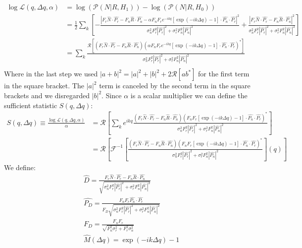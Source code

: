 \documentclass[a4paper]{article}
\newcommand{\rb}[1]{\left(#1\right)}
\newcommand{\sqb}[1]{\left[#1\right]}
\newcommand{\abs}[1]{\left|#1\right|}
\begin{document}
	\begin{equation}
	\begin{split}
	\log{\mathcal{L}\rb{q,\Delta q,\alpha}} &= \log\rb{\mathcal{P}\rb{N|R,H_1}} - \log\rb{\mathcal{P}\rb{N|R,H_0}}\\
	& = \frac{1}{2}\sum_k \sqb{- \frac{\abs{F_r \hat{N} \cdot \hat{P_r} - F_n \hat{R}\cdot \hat{P_n} - \alpha F_n F_r e^{-ikq}\sqb{\exp\rb{-ik\Delta q} - 1}\cdot \hat{P_n}\cdot \hat{P_r}}^2}{\sigma^2_n F_r^2 \abs{\hat{P_r}}^2 + \sigma^2_r F_n^2 \abs{\hat{P_n}}^2} + \frac{\abs{F_r \hat{N} \cdot \hat{P_r} - F_n \hat{R}\cdot \hat{P_n}}^2}{\sigma^2_n F_r^2 \abs{\hat{P_r}}^2 + \sigma^2_r F_n^2 \abs{\hat{P_n}}^2}}\\
	& = \sum_k \frac{\mathcal{R}\sqb{\rb{F_r \hat{N} \cdot \hat{P_r} - F_n \hat{R}\cdot \hat{P_n}} \rb{\alpha F_n F_r e^{-ikq} \sqb{\exp\rb{-ik\Delta q} - 1}\cdot \hat{P_n}\cdot \hat{P_r}}^*}}{\sigma^2_n F_r^2 \abs{\hat{P_r}}^2 + \sigma^2_r F_n^2 \abs{\hat{P_n}}^2 }\\
	\end{split}
	\end{equation}
	Where in the last step we used $\abs{a+b}^2 = \abs{a}^2 + \abs{b}^2 + 2\mathcal{R}\sqb{ab^*}$ for the first term in the square bracket. The $\abs{a}^2$ term is canceled by the second term in the square brackets and we disregarded $\abs{b}^2$.
	Since $\alpha$ is a scalar multiplier we can define the sufficient statistic $S\rb{q,\Delta q}$:
	\begin{equation}
	\begin{split}
	S\rb{q,\Delta q} \equiv \frac{\log{\mathcal{L}\rb{q,\Delta q,\alpha}}}{\alpha} & = \mathcal{R}\sqb{\sum_k e^{ikq} \frac{\rb{F_r \hat{N} \cdot \hat{P_r} - F_n \hat{R}\cdot \hat{P_n}} \rb{F_n F_r \sqb{\exp\rb{-ik\Delta q} - 1}\cdot \hat{P_n}\cdot \hat{P_r}}^*}{\sigma^2_n F_r^2 \abs{\hat{P_r}}^2 + \sigma^2_r F_n^2 \abs{\hat{P_n}}^2 }}\\
	& = \mathcal{R}\sqb{\mathcal{F}^{-1}\sqb{\frac{\rb{F_r \hat{N} \cdot \hat{P_r} - F_n \hat{R}\cdot \hat{P_n}} \rb{F_n F_r \sqb{\exp\rb{-ik\Delta q} - 1}\cdot \hat{P_n}\cdot \hat{P_r}}^*}{\sigma^2_n F_r^2 \abs{\hat{P_r}}^2 + \sigma^2_r F_n^2 \abs{\hat{P_n}}^2 }}\rb{q}}
	\end{split}
	\end{equation}
	We define:
	\begin{equation}
	\begin{split}
	& \hat{D} = \frac{F_r \hat{N} \cdot \hat{P_r} - F_n \hat{R}\cdot \hat{P_n}}{\sqrt{\sigma^2_n F_r^2 \abs{\hat{P_r}}^2 + \sigma^2_r F_n^2 \abs{\hat{P_n}}^2}}\\
	& \hat{P_D} = \frac{F_n F_r \hat{P_n}\cdot \hat{P_r}}{F_D \sqrt{\sigma^2_n F_r^2 \abs{\hat{P_r}}^2 + \sigma^2_r F_n^2 \abs{\hat{P_n}}^2}}\\
	& F_D = \frac{F_n F_r}{\sqrt{F_n^2 \sigma_r^2 + F_r^2 \sigma_n^2}}\\
	& \hat{M} \rb{\Delta q} = \exp\rb{-ik\Delta q} - 1\\
	\end{split}
	\end{equation}
\end{document}
